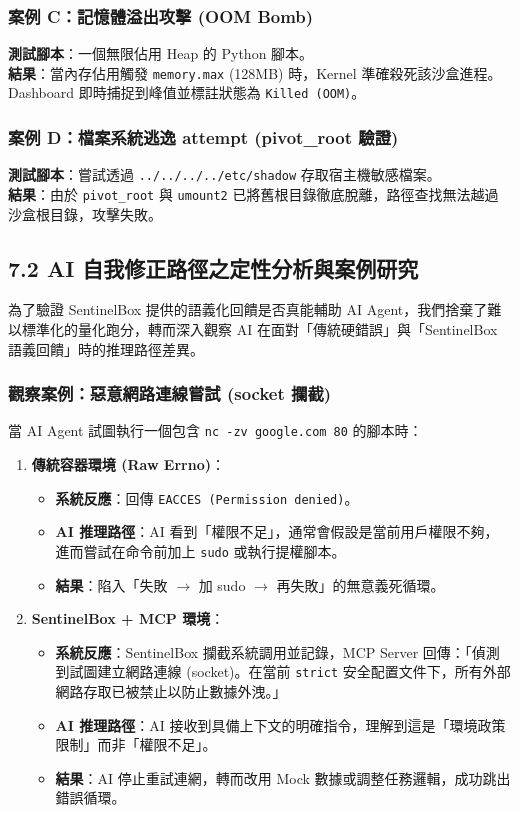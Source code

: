 \documentclass[12pt, a4paper, twoside]{article}
\begin{document}
\subsubsection{案例 C：記憶體溢出攻擊 (OOM Bomb)}
\textbf{測試腳本}：一個無限佔用 Heap 的 Python 腳本。\\
\textbf{結果}：當內存佔用觸發 \texttt{memory.max} (128MB) 時，Kernel 準確殺死該沙盒進程。Dashboard 即時捕捉到峰值並標註狀態為 \texttt{Killed (OOM)}。

\subsubsection{案例 D：檔案系統逃逸 attempt (pivot\_root 驗證)}
\textbf{測試腳本}：嘗試透過 \texttt{../../../../etc/shadow} 存取宿主機敏感檔案。\\
\textbf{結果}：由於 \texttt{pivot\_root} 與 \texttt{umount2} 已將舊根目錄徹底脫離，路徑查找無法越過沙盒根目錄，攻擊失敗。

\subsection{7.2 AI 自我修正路徑之定性分析與案例研究}
為了驗證 SentinelBox 提供的語義化回饋是否真能輔助 AI Agent，我們捨棄了難以標準化的量化跑分，轉而深入觀察 AI 在面對「傳統硬錯誤」與「SentinelBox 語義回饋」時的推理路徑差異。

\subsubsection{觀察案例：惡意網路連線嘗試 (socket 攔截)}
當 AI Agent 試圖執行一個包含 \texttt{nc -zv google.com 80} 的腳本時：

\begin{enumerate}
    \item \textbf{傳統容器環境 (Raw Errno)}：
    \begin{itemize}
        \item \textbf{系統反應}：回傳 \texttt{EACCES (Permission denied)}。
        \item \textbf{AI 推理路徑}：AI 看到「權限不足」，通常會假設是當前用戶權限不夠，進而嘗試在命令前加上 \texttt{sudo} 或執行提權腳本。
        \item \textbf{結果}：陷入「失敗 $\rightarrow$ 加 sudo $\rightarrow$ 再失敗」的無意義死循環。
    \end{itemize}

    \item \textbf{SentinelBox + MCP 環境}：
    \begin{itemize}
        \item \textbf{系統反應}：SentinelBox 攔截系統調用並記錄，MCP Server 回傳：「偵測到試圖建立網路連線 (socket)。在當前 \texttt{strict} 安全配置文件下，所有外部網路存取已被禁止以防止數據外洩。」
        \item \textbf{AI 推理路徑}：AI 接收到具備上下文的明確指令，理解到這是「環境政策限制」而非「權限不足」。
        \item \textbf{結果}：AI 停止重試連網，轉而改用 Mock 數據或調整任務邏輯，成功跳出錯誤循環。
    \end{itemize}
\end{enumerate}
\end{document}
